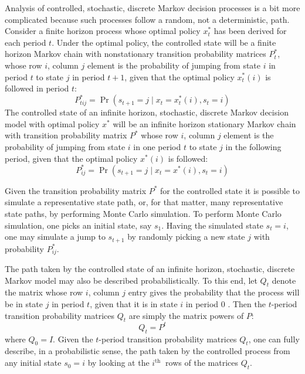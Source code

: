 \documentclass[\topdir/lecture\_notes.tex]{subfiles}
\begin{document}
\begin{optional}
Analysis of controlled, stochastic, discrete Markov decision processes is a bit more complicated because such processes follow a random, not a deterministic, path. Consider a finite horizon process whose optimal policy $x_{t}^{*}$ has been derived for each period $t$. Under the optimal policy, the controlled state will be a finite horizon Markov chain with nonstationary transition probability matrices $P_{t}^{*}$, whose row $i$, column $j$ element is the probability of jumping from state $i$ in period $t$ to state $j$ in period $t+1$, given that the optimal policy $x_{t}^{*}(i)$ is followed in period $t$:
\begin{equation*}
P_{t i j}^{*}=\operatorname{Pr}\left(s_{t+1}=j \mid x_{t}=x_{t}^{*}(i), s_{t}=i\right)
\end{equation*}
The controlled state of an infinite horizon, stochastic, discrete Markov decision model with optimal policy $x^{*}$ will be an infinite horizon stationary Markov chain with transition probability matrix $P^{*}$ whose row $i$, column $j$ element is the probability of jumping from state $i$ in one period $t$ to state $j$ in the following period, given that the optimal policy $x^{*}(i)$ is followed:
\begin{equation*}
P_{i j}^{*}=\operatorname{Pr}\left(s_{t+1}=j \mid x_{t}=x^{*}(i), s_{t}=i\right)
\end{equation*}

Given the transition probability matrix $P^{*}$ for the controlled state it is possible to simulate a representative state path, or, for that matter, many representative state paths, by performing Monte Carlo simulation. To perform Monte Carlo simulation, one picks an initial state, say $s_{1}$. Having the simulated state $s_{t}=i$, one may simulate a jump to $s_{t+1}$ by randomly picking a new state $j$ with probability $P_{i j}^{*}$.

The path taken by the controlled state of an infinite horizon, stochastic, discrete Markov model may also be described probabilistically. To this end, let $Q_{t}$ denote the matrix whose row $i$, column $j$ entry gives the probability that the process will be in state $j$ in period $t$, given that it is in state $i$ in period 0 . Then the $t$-period transition probability matrices $Q_{t}$ are simply the matrix powers of $P$:
\begin{equation*}
Q_{t}=P^{t}
\end{equation*}
where $Q_{0}=I$. Given the $t$-period transition probability matrices $Q_{t}$, one can fully describe, in a probabilistic sense, the path taken by the controlled process from any initial state $s_{0}=i$ by looking at the $i^{\text {th }}$ rows of the matrices $Q_{t}$.


\end{optional}
\end{document}
